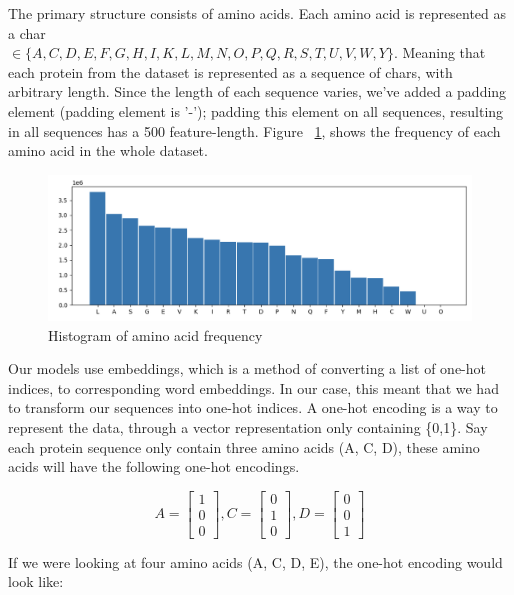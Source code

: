\noindent
The primary structure consists of amino acids. Each amino acid is represented as a char \\ $\in \{A, C, D, E, F, G, H, I, K, L, M, N, O, P, Q, R, S, T, U, V, W, Y\}$. Meaning that each protein from the dataset is represented as a sequence of chars, with arbitrary length. Since the length of each sequence varies, we've added a padding element (padding element is '-'); padding this element on all sequences, resulting in all sequences has a 500 feature-length. Figure ~\ref{fig:before}, shows the frequency of each amino acid in the whole dataset.\\

\begin{figure}[!ht]
  \centering
  \includegraphics[scale=0.4]{latex/imgs/aminoFreq.png}
  \caption{Histogram of amino acid frequency}\label{fig:before}
\end{figure}

\noindent
Our models use embeddings, which is a method of converting a list of one-hot indices, to corresponding word embeddings. In our case, this meant that we had to transform our sequences into one-hot indices. A one-hot encoding is a way to represent the data, through a vector representation only containing \{0,1\}. Say each protein sequence only contain three amino acids (A, C, D), these amino acids will have the following one-hot encodings.

$$
A = \begin{bmatrix}
1 \\
0 \\
0
\end{bmatrix},
C = \begin{bmatrix}
0 \\
1 \\
0
\end{bmatrix},
D= \begin{bmatrix}
0 \\
0 \\
1
\end{bmatrix}
$$

\noindent
If we were looking at four amino acids (A, C, D, E), the one-hot encoding would look like:

